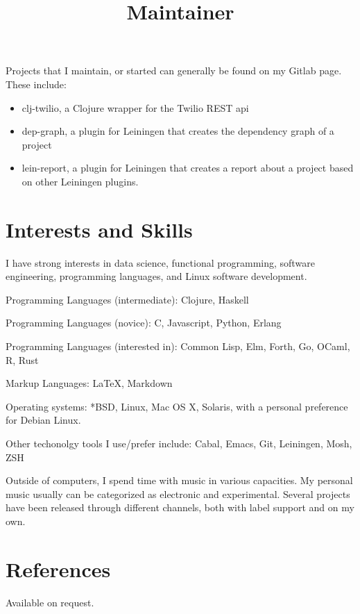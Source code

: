 \documentclass[margintitle,line]{res}
\begin{document}
\begin{resume}
\title{Maintainer}
\begin{position}
Projects that I maintain, or started can generally be found on my
Gitlab page. These include:
\begin{itemize}
\item{clj-twilio, a Clojure wrapper for the Twilio REST api}
\item{dep-graph, a plugin for Leiningen that creates the dependency
    graph of a project}
\item{lein-report, a plugin for Leiningen that creates a report about
    a project based on other Leiningen plugins.}
\end{itemize}
\end{position}


\section{Interests and Skills}

I have strong interests in data science, functional programming,
software engineering, programming languages, and Linux software development.

Programming Languages (intermediate): Clojure, Haskell

Programming Languages (novice): C, Javascript, Python, Erlang

Programming Languages (interested in): Common Lisp, Elm, Forth,
Go, OCaml, R, Rust

Markup Languages: LaTeX, Markdown

Operating systems: *BSD, Linux, Mac OS X, Solaris, with a personal
preference for Debian Linux.

Other techonolgy tools I use/prefer include: Cabal, Emacs, Git, Leiningen, Mosh, ZSH

Outside of computers, I spend time with music in various
capacities. My personal music usually can be categorized as electronic
and experimental. Several projects have been released through
different channels, both with label support and on my own.

\section{References}

Available on request.

\end{resume}
\end{document}
